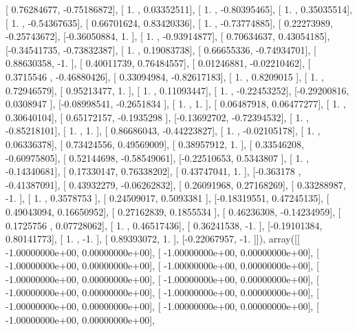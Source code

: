 \documentclass{article}
\begin{document}
       [ 0.76284677, -0.75186872],
       [ 1.        ,  0.03352511],
       [ 1.        , -0.80395465],
       [ 1.        ,  0.35035514],
       [ 1.        , -0.54367635],
       [ 0.66701624,  0.83420336],
       [ 1.        , -0.73774885],
       [ 0.22273989, -0.25743672],
       [-0.36050884,  1.        ],
       [ 1.        , -0.93914877],
       [ 0.70634637,  0.43054185],
       [-0.34541735, -0.73832387],
       [ 1.        ,  0.19083738],
       [ 0.66655336, -0.74934701],
       [ 0.88630358, -1.        ],
       [ 0.40011739,  0.76484557],
       [ 0.01246881, -0.02210462],
       [ 0.3715546 , -0.46880426],
       [ 0.33094984, -0.82617183],
       [ 1.        ,  0.8209015 ],
       [ 1.        ,  0.72946579],
       [ 0.95213477,  1.        ],
       [ 1.        ,  0.11093447],
       [ 1.        , -0.22453252],
       [-0.29200816,  0.0308947 ],
       [-0.08998541, -0.2651834 ],
       [ 1.        ,  1.        ],
       [ 0.06487918,  0.06477277],
       [ 1.        ,  0.30640104],
       [ 0.65172157, -0.1935298 ],
       [-0.13692702, -0.72394532],
       [ 1.        , -0.85218101],
       [ 1.        ,  1.        ],
       [ 0.86686043, -0.44223827],
       [ 1.        , -0.02105178],
       [ 1.        ,  0.06336378],
       [ 0.73424556,  0.49569009],
       [ 0.38957912,  1.        ],
       [ 0.33546208, -0.60975805],
       [ 0.52144698, -0.58549061],
       [-0.22510653,  0.5343807 ],
       [ 1.        , -0.14340681],
       [ 0.17330147,  0.76338202],
       [ 0.43747041,  1.        ],
       [-0.363178  , -0.41387091],
       [ 0.43932279, -0.06262832],
       [ 0.26091968,  0.27168269],
       [ 0.33288987, -1.        ],
       [ 1.        ,  0.3578753 ],
       [ 0.24509017,  0.5093381 ],
       [-0.18319551,  0.47245135],
       [ 0.49043094,  0.16650952],
       [ 0.27162839,  0.1855534 ],
       [ 0.46236308, -0.14234959],
       [ 0.1725756 ,  0.07728062],
       [ 1.        ,  0.46517436],
       [ 0.36241538, -1.        ],
       [-0.19101384,  0.80141773],
       [ 1.        , -1.        ],
       [ 0.89393072,  1.        ],
       [-0.22067957, -1.        ]]), array([[ -1.00000000e+00,   0.00000000e+00],
       [ -1.00000000e+00,   0.00000000e+00],
       [ -1.00000000e+00,   0.00000000e+00],
       [ -1.00000000e+00,   0.00000000e+00],
       [ -1.00000000e+00,   0.00000000e+00],
       [ -1.00000000e+00,   0.00000000e+00],
       [ -1.00000000e+00,   0.00000000e+00],
       [ -1.00000000e+00,   0.00000000e+00],
       [ -1.00000000e+00,   0.00000000e+00],
       [ -1.00000000e+00,   0.00000000e+00],
       [ -1.00000000e+00,   0.00000000e+00],
\end{document}
